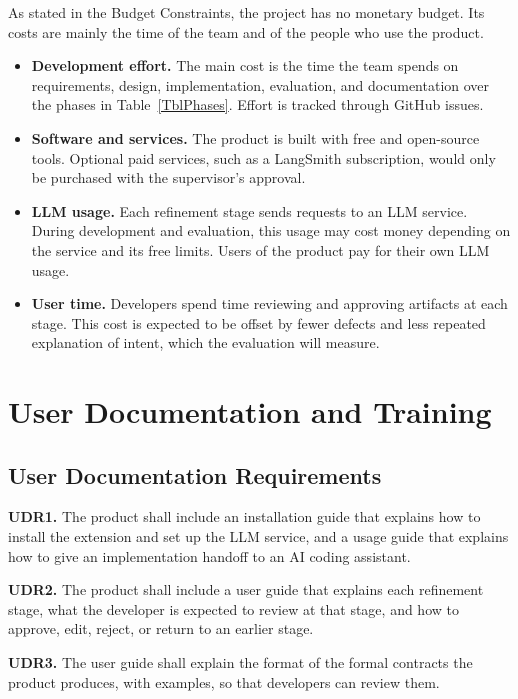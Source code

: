 \documentclass[12pt]{article}
\begin{document}
As stated in the Budget Constraints, the project has no monetary budget. Its
costs are mainly the time of the team and of the people who use the product.

\begin{itemize}
  \item \textbf{Development effort.} The main cost is the time the team spends
  on requirements, design, implementation, evaluation, and documentation over
  the phases in Table~\ref{TblPhases}. Effort is tracked through GitHub issues.
  \item \textbf{Software and services.} The product is built with free and
  open-source tools. Optional paid services, such as a LangSmith subscription,
  would only be purchased with the supervisor's approval.
  \item \textbf{LLM usage.} Each refinement stage sends requests to an LLM
  service. During development and evaluation, this usage may cost money
  depending on the service and its free limits. Users of the product pay for
  their own LLM usage.
  \item \textbf{User time.} Developers spend time reviewing and approving
  artifacts at each stage. This cost is expected to be offset by fewer defects
  and less repeated explanation of intent, which the evaluation will measure.
\end{itemize}

\section{User Documentation and Training}
\subsection{User Documentation Requirements}

\medskip
\noindent\textbf{UDR1.} The product shall include an installation guide that
explains how to install the extension and set up the LLM service, and a usage
guide that explains how to give an implementation handoff to an AI coding
assistant.

\medskip
\noindent\textbf{UDR2.} The product shall include a user guide that explains
each refinement stage, what the developer is expected to review at that stage,
and how to approve, edit, reject, or return to an earlier stage.

\medskip
\noindent\textbf{UDR3.} The user guide shall explain the format of the formal
contracts the product produces, with examples, so that developers can review
them.
\end{document}
